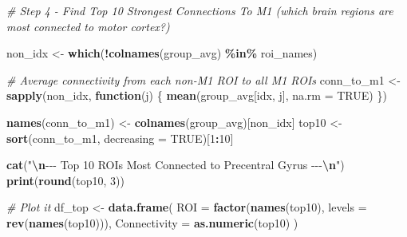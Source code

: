 \documentclass[
]{article}
\newenvironment{Shaded}{\begin{snugshade}}{\end{snugshade}}
\newcommand{\AttributeTok}[1]{\textcolor[rgb]{0.13,0.29,0.53}{#1}}
\newcommand{\CommentTok}[1]{\textcolor[rgb]{0.56,0.35,0.01}{\textit{#1}}}
\newcommand{\ConstantTok}[1]{\textcolor[rgb]{0.56,0.35,0.01}{#1}}
\newcommand{\ControlFlowTok}[1]{\textcolor[rgb]{0.13,0.29,0.53}{\textbf{#1}}}
\newcommand{\DecValTok}[1]{\textcolor[rgb]{0.00,0.00,0.81}{#1}}
\newcommand{\FunctionTok}[1]{\textcolor[rgb]{0.13,0.29,0.53}{\textbf{#1}}}
\newcommand{\NormalTok}[1]{#1}
\newcommand{\OtherTok}[1]{\textcolor[rgb]{0.56,0.35,0.01}{#1}}
\newcommand{\SpecialCharTok}[1]{\textcolor[rgb]{0.81,0.36,0.00}{\textbf{#1}}}
\newcommand{\StringTok}[1]{\textcolor[rgb]{0.31,0.60,0.02}{#1}}
\begin{document}
\begin{Shaded}
\begin{Highlighting}[]
\CommentTok{\# Step 4 {-} Find Top 10 Strongest Connections To M1 (which brain regions are most connected to motor cortex?)}

\NormalTok{non\_idx }\OtherTok{\textless{}{-}} \FunctionTok{which}\NormalTok{(}\SpecialCharTok{!}\FunctionTok{colnames}\NormalTok{(group\_avg) }\SpecialCharTok{\%in\%}\NormalTok{ roi\_names)}

\CommentTok{\# Average connectivity from each non{-}M1 ROI to all M1 ROIs}
\NormalTok{conn\_to\_m1 }\OtherTok{\textless{}{-}} \FunctionTok{sapply}\NormalTok{(non\_idx, }\ControlFlowTok{function}\NormalTok{(j) \{}
  \FunctionTok{mean}\NormalTok{(group\_avg[idx, j], }\AttributeTok{na.rm =} \ConstantTok{TRUE}\NormalTok{)}
\NormalTok{\})}

\FunctionTok{names}\NormalTok{(conn\_to\_m1) }\OtherTok{\textless{}{-}} \FunctionTok{colnames}\NormalTok{(group\_avg)[non\_idx]}
\NormalTok{top10 }\OtherTok{\textless{}{-}} \FunctionTok{sort}\NormalTok{(conn\_to\_m1, }\AttributeTok{decreasing =} \ConstantTok{TRUE}\NormalTok{)[}\DecValTok{1}\SpecialCharTok{:}\DecValTok{10}\NormalTok{]}

\FunctionTok{cat}\NormalTok{(}\StringTok{"}\SpecialCharTok{\textbackslash{}n}\StringTok{{-}{-}{-} Top 10 ROIs Most Connected to Precentral Gyrus {-}{-}{-}}\SpecialCharTok{\textbackslash{}n}\StringTok{"}\NormalTok{)}
\FunctionTok{print}\NormalTok{(}\FunctionTok{round}\NormalTok{(top10, }\DecValTok{3}\NormalTok{))}

\CommentTok{\# Plot it}
\NormalTok{df\_top }\OtherTok{\textless{}{-}} \FunctionTok{data.frame}\NormalTok{(}
  \AttributeTok{ROI          =} \FunctionTok{factor}\NormalTok{(}\FunctionTok{names}\NormalTok{(top10), }\AttributeTok{levels =} \FunctionTok{rev}\NormalTok{(}\FunctionTok{names}\NormalTok{(top10))),}
  \AttributeTok{Connectivity =} \FunctionTok{as.numeric}\NormalTok{(top10)}
\NormalTok{)}


\end{Highlighting}
\end{Shaded}
\end{document}
